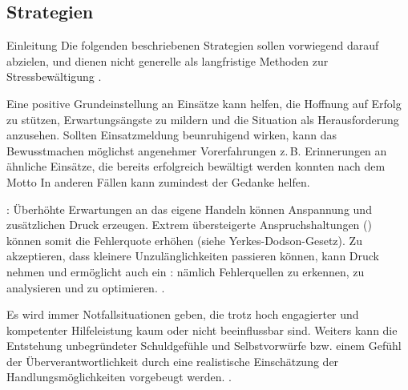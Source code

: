 \subsection{ Strategien}

\Text
{{Einleitung}}%
{%
Die folgenden beschriebenen Strategien sollen  vorwiegend
darauf abzielen,  und dienen nicht generelle als langfristige Methoden zur
Stressbewältigung \cite{Karutz200912}.
}%



{Eine positive Grundeinstellung an Einsätze
kann helfen, die Hoffnung auf Erfolg zu stützen,
Erwartungsängste zu mildern und die Situation als
Herausforderung anzusehen. Sollten Einsatzmeldung
beunruhigend wirken, kann das Bewusstmachen möglichst angenehmer
Vorerfahrungen z.\,B. Erinnerungen an ähnliche Einsätze, die
bereits erfolgreich bewältigt werden konnten nach dem Motto
 In anderen Fällen
kann zumindest der Gedanke  helfen.

: Überhöhte Erwartungen
an das eigene Handeln können Anspannung und zusätzlichen
Druck erzeugen. Extrem übersteigerte Anspruchshaltungen
() können
somit die Fehlerquote erhöhen (siehe Yerkes-Dodson-Gesetz). Zu
akzeptieren, dass kleinere Unzulänglichkeiten passieren
können, kann Druck nehmen und ermöglicht auch ein
: nämlich Fehlerquellen zu erkennen,
zu analysieren und zu optimieren. .

Es wird immer Notfallsituationen geben, die trotz hoch engagierter und
kompetenter Hilfeleistung kaum oder nicht beeinflussbar
sind. Weiters kann die Entstehung unbegründeter
Schuldgefühle und Selbstvorwürfe bzw. einem Gefühl der
Überverantwortlichkeit durch eine realistische Einschätzung
der Handlungsmöglichkeiten vorgebeugt werden.
.}
{}
{}
{}
{}

